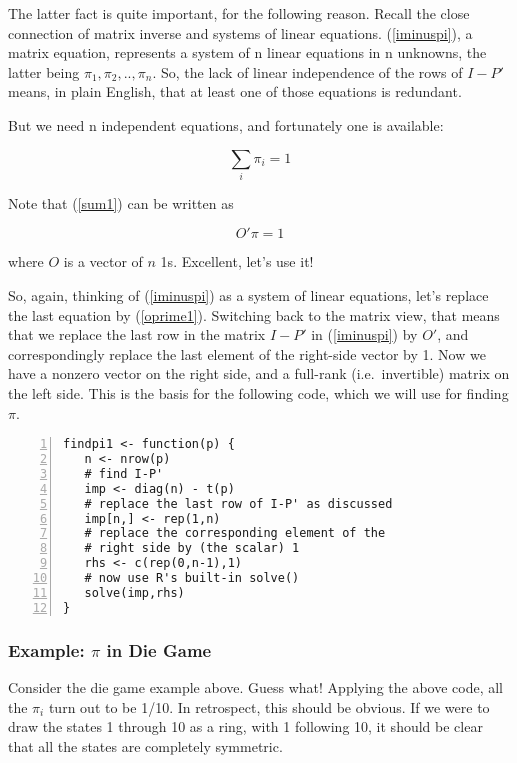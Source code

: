 The latter fact is quite important, for the following reason.  Recall
the close connection of matrix inverse and systems of linear equations.
(\ref{iminuspi}), a matrix equation, represents a system of n linear
equations in n unknowns, the latter being $\pi_1, \pi_2,.., \pi_n$.
So, the lack of linear independence of the rows of $I-P'$ means, 
in plain English, that at least one of those equations is redundant.

But we need n independent equations, and fortunately one is available:

\begin{equation}
\label{sum1}
\sum_{i}\pi_{i}=1
\end{equation}

Note that (\ref{sum1}) can be written as

\begin{equation}
\label{oprime1}
O' \pi = 1
\end{equation}

where $O$ is a vector of $n$ 1s.   Excellent, let's use it!

So, again, thinking of (\ref{iminuspi}) as a system of linear equations,
let's replace the last equation by (\ref{oprime1}).  Switching back to
the matrix view, that means that we replace the last row in the matrix
$I - P'$ in (\ref{iminuspi}) by $O'$, and correspondingly replace the
last element of the right-side vector by 1.  Now we have a nonzero
vector on the right side, and a full-rank (i.e.\ invertible) matrix on
the left side.  This is the basis for the following code, which we will
use for finding $\pi$.

\begin{lstlisting}[numbers=left]
findpi1 <- function(p) {
   n <- nrow(p)
   # find I-P'
   imp <- diag(n) - t(p)  
   # replace the last row of I-P' as discussed
   imp[n,] <- rep(1,n)
   # replace the corresponding element of the 
   # right side by (the scalar) 1
   rhs <- c(rep(0,n-1),1)
   # now use R's built-in solve()
   solve(imp,rhs)
}
\end{lstlisting}

\subsubsection{Example:  $\pi$ in Die Game}

Consider the die game example above.  Guess what!  Applying the above
code, all the $\pi_i$ turn out to be 1/10.  In retrospect, this should
be obvious.  If we were to draw the states 1 through 10 as a ring, with
1 following 10, it should be clear that all the states are completely
symmetric.

